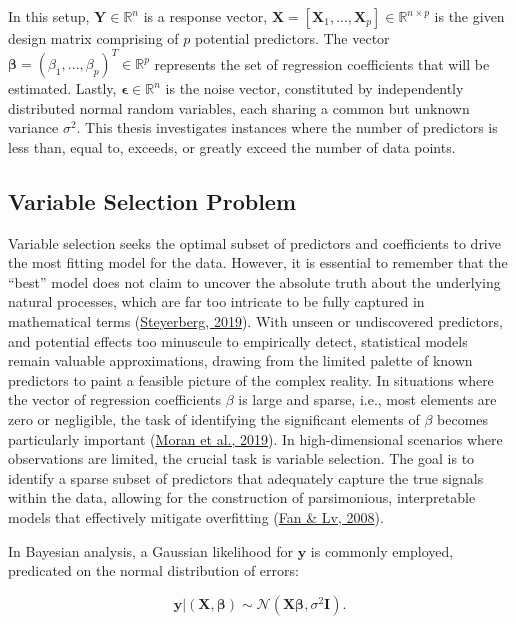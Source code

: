 \documentclass[
  11pt,
]{article}
\begin{document}
In this setup, \(\mathbf{Y} \in \mathbb{R}^n\) is a response vector,
\(\mathbf{X} = [\mathbf{X}_1, ..., \mathbf{X}_p] \in \mathbb{R}^{n \times p}\)
is the given design matrix comprising of \(p\) potential predictors. The
vector
\(\boldsymbol{\beta} = (\beta_1, ..., \beta_p)^T \in \mathbb{R}^p\)
represents the set of regression coefficients that will be estimated.
Lastly, \(\boldsymbol{\epsilon} \in \mathbb{R}^n\) is the noise vector,
constituted by independently distributed normal random variables, each
sharing a common but unknown variance \(\sigma^2\). This thesis
investigates instances where the number of predictors is less than,
equal to, exceeds, or greatly exceed the number of data points.

\subsection{Variable Selection Problem}

Variable selection seeks the optimal subset of predictors and
coefficients to drive the most fitting model for the data. However, it
is essential to remember that the ``best'' model does not claim to
uncover the absolute truth about the underlying natural processes, which
are far too intricate to be fully captured in mathematical terms
(\protect\hyperlink{ref-Ewout2019}{Steyerberg, 2019}). With unseen or
undiscovered predictors, and potential effects too minuscule to
empirically detect, statistical models remain valuable approximations,
drawing from the limited palette of known predictors to paint a feasible
picture of the complex reality. In situations where the vector of
regression coefficients \(\beta\) is large and sparse, i.e., most
elements are zero or negligible, the task of identifying the significant
elements of \(\beta\) becomes particularly important
(\protect\hyperlink{ref-Moran2019}{Moran et al., 2019}). In
high-dimensional scenarios where observations are limited, the crucial
task is variable selection. The goal is to identify a sparse subset of
predictors that adequately capture the true signals within the data,
allowing for the construction of parsimonious, interpretable models that
effectively mitigate overfitting (\protect\hyperlink{ref-Fan2008}{Fan \&
Lv, 2008}).

In Bayesian analysis, a Gaussian likelihood for \(\mathbf{y}\) is
commonly employed, predicated on the normal distribution of errors:

\begin{equation}
\mathbf{y} | (\mathbf{X}, \boldsymbol{\beta}) \sim \mathcal{N}(\mathbf{X}\boldsymbol{\beta}, \sigma^2\mathbf{I}).
\end{equation}
\end{document}
